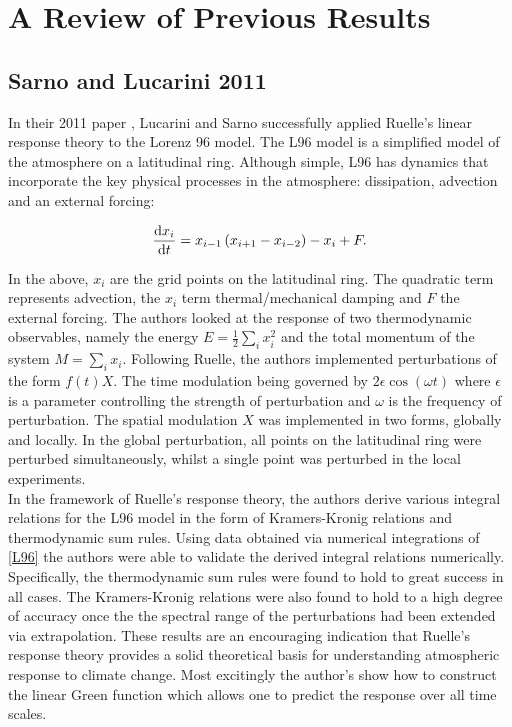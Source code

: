 \section{A Review of Previous Results}

\subsection{Sarno and Lucarini 2011}

In their 2011 paper \cite{Lucarini2011}, Lucarini and Sarno successfully applied Ruelle's linear response theory to the Lorenz 96 model. The L96 model is a simplified model of the atmosphere on a latitudinal ring. Although simple, L96 has dynamics that incorporate the key physical processes in the atmosphere: dissipation, advection and an external forcing: 

\begin{align} \label{L96}
\dv{x_i}{t} = x_{i-1} \left( x_{i+1} - x_{i-2} \right) - x_i + F. 
\end{align} 

\noindent In the above, $x_i$ are the grid points on the latitudinal ring. The quadratic term represents advection, the $x_i$ term thermal/mechanical damping and $F$ the external forcing. The authors looked at the response of two thermodynamic observables, namely the energy $E = \frac{1}{2} \sum_i x_i ^2$ and the total momentum of the system $M = \sum_i x_i$. Following Ruelle, the authors implemented perturbations of the form $f(t)X$. The time modulation being governed by $2 \epsilon \cos(\omega t)$ where $\epsilon$ is a parameter controlling the strength of perturbation and $\omega$ is the frequency of perturbation. The spatial modulation $X$ was implemented in two forms, globally and locally. In the global perturbation, all points on the latitudinal ring were perturbed simultaneously, whilst a single point was perturbed in the local experiments.\\

\noindent In the framework of Ruelle's response theory, the authors derive various integral relations for the L96 model in the form of Kramers-Kronig relations and thermodynamic sum rules. Using data obtained via numerical integrations of \ref{L96} the authors were able to validate the derived integral relations numerically. Specifically, the thermodynamic sum rules were found to hold to great success in all cases. The Kramers-Kronig relations were also found to hold to a high degree of accuracy once the the spectral range of the perturbations had been extended via extrapolation. These results are an encouraging indication that Ruelle's response theory provides a solid theoretical basis for understanding atmospheric response to climate change. Most excitingly the author's show how to construct the linear Green function which allows one to predict the response over all time scales. 

